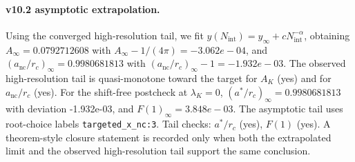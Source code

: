 \paragraph{v10.2 asymptotic extrapolation.}
Using the converged high-resolution tail, we fit $y(N_{\mathrm{int}})=y_{\infty}+cN_{\mathrm{int}}^{-\alpha}$, obtaining $A_\infty=0.0792712608$ with $A_\infty-1/(4\pi)=-3.062e-04$, and $(a_{\mathrm{nc}}/r_c)_\infty=0.9980681813$ with $(a_{\mathrm{nc}}/r_c)_\infty-1=-1.932e-03$. The observed high-resolution tail is quasi-monotone toward the target for $A_K$ (yes) and for $a_{\mathrm{nc}}/r_c$ (yes). For the shift-free postcheck at $\lambda_K=0$, $(a^*/r_c)_\infty=0.9980681813$ with deviation -1.932e-03, and $F(1)_\infty=3.848e-03$. The asymptotic tail uses root-choice labels \texttt{targeted_x_nc:3}. Tail checks: $a^*/r_c$ (yes), $F(1)$ (yes). A theorem-style closure statement is recorded only when both the extrapolated limit and the
observed high-resolution tail support the same conclusion.
